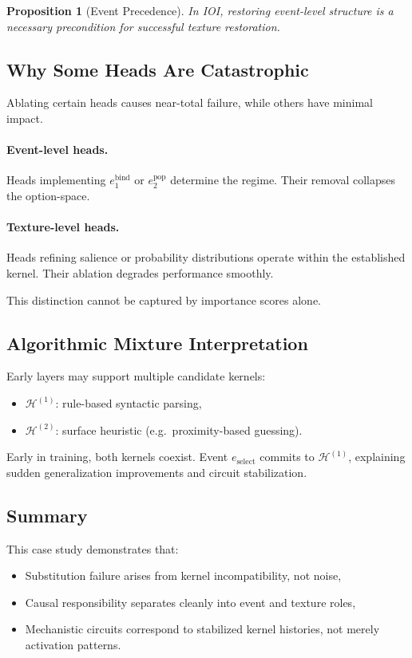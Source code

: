 \documentclass[11pt]{article}
\newtheorem{proposition}{Proposition}
\theoremstyle{remark}
\newcommand{\Hist}{\mathcal{H}}
\begin{document}
\begin{proposition}[Event Precedence]
In IOI, restoring event-level structure is a necessary precondition
for successful texture restoration.
\end{proposition}

\subsection{Why Some Heads Are Catastrophic}

Ablating certain heads causes near-total failure, while others have
minimal impact.

\paragraph{Event-level heads.}
Heads implementing $e_1^{\text{bind}}$ or $e_2^{\text{pop}}$ determine
the regime. Their removal collapses the option-space.

\paragraph{Texture-level heads.}
Heads refining salience or probability distributions operate within
the established kernel. Their ablation degrades performance smoothly.

This distinction cannot be captured by importance scores alone.

\subsection{Algorithmic Mixture Interpretation}

Early layers may support multiple candidate kernels:
\begin{itemize}
\item $\Hist^{(1)}$: rule-based syntactic parsing,
\item $\Hist^{(2)}$: surface heuristic (e.g.\ proximity-based guessing).
\end{itemize}

Early in training, both kernels coexist. Event $e_{\text{select}}$
commits to $\Hist^{(1)}$, explaining sudden generalization improvements
and circuit stabilization.

\subsection{Summary}

This case study demonstrates that:
\begin{itemize}
\item Substitution failure arises from kernel incompatibility, not
noise,
\item Causal responsibility separates cleanly into event and texture
roles,
\item Mechanistic circuits correspond to stabilized kernel histories,
not merely activation patterns.
\end{itemize}
\end{document}
